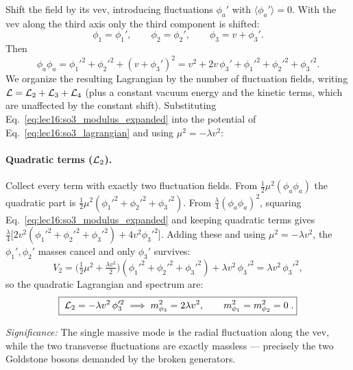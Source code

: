 Shift the field by its vev, introducing fluctuations $\phi_a'$ with $\langle\phi_a'\rangle=0$. With the vev along the third axis only the third component is shifted:
\begin{equation}
  \phi_1=\phi_1',\qquad
  \phi_2=\phi_2',\qquad
  \phi_3=v+\phi_3' .
  \label{eq:lec16:so3_shift}
\end{equation}
Then
\begin{equation}
  \phi_a\phi_a
  =\phi_1'^2+\phi_2'^2+(v+\phi_3')^2
  =v^2+2v\,\phi_3'+\phi_1'^2+\phi_2'^2+\phi_3'^2 .
  \label{eq:lec16:so3_modulus_expanded}
\end{equation}
We organize the resulting Lagrangian by the number of fluctuation fields, writing $\mathcal{L}=\mathcal{L}_2+\mathcal{L}_3+\mathcal{L}_4$ (plus a constant vacuum energy and the kinetic terms, which are unaffected by the constant shift). Substituting Eq.~\eqref{eq:lec16:so3_modulus_expanded} into the potential of Eq.~\eqref{eq:lec16:so3_lagrangian} and using $\mu^2=-\lambda v^2$:

\paragraph{Quadratic terms ($\mathcal{L}_2$).}
Collect every term with exactly two fluctuation fields. From $\tfrac12\mu^2(\phi_a\phi_a)$ the quadratic part is $\tfrac12\mu^2(\phi_1'^2+\phi_2'^2+\phi_3'^2)$. From $\tfrac{\lambda}{4}(\phi_a\phi_a)^2$, squaring Eq.~\eqref{eq:lec16:so3_modulus_expanded} and keeping quadratic terms gives $\tfrac{\lambda}{4}\big[2v^2(\phi_1'^2+\phi_2'^2+\phi_3'^2)+4v^2\phi_3'^2\big]$. Adding these and using $\mu^2=-\lambda v^2$, the $\phi_1',\phi_2'$ masses cancel and only $\phi_3'$ survives:
\begin{equation}
  V_2
  =\Big(\tfrac12\mu^2+\tfrac{\lambda v^2}{2}\Big)(\phi_1'^2+\phi_2'^2+\phi_3'^2)
   +\lambda v^2\,\phi_3'^2
  =\lambda v^2\,\phi_3'^2 ,
  \label{eq:lec16:so3_quadratic_potential}
\end{equation}
so the quadratic Lagrangian and spectrum are:
\begin{equation}
  \boxed{\;\mathcal{L}_2=-\lambda v^2\,\phi_3'^2
  \;\Longrightarrow\;
  m_{\phi_3}^2=2\lambda v^2,\qquad m_{\phi_1}^2=m_{\phi_2}^2=0\; .}
  \label{eq:lec16:so3_spectrum}
\end{equation}

\textit{Significance:} The single massive mode is the radial fluctuation along the vev, while the two transverse fluctuations are exactly massless --- precisely the two Goldstone bosons demanded by the broken generators.


